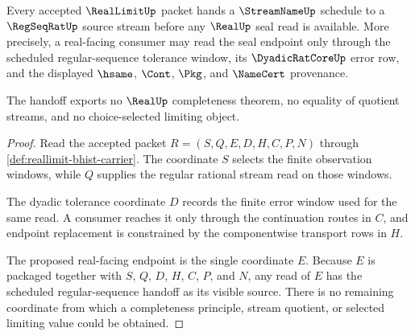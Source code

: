 \begin{theorem}
\label{thm:reallimit-regseqrat-streamname-handoff}
Every accepted $\RealLimitUp$ packet hands a $\StreamNameUp$ schedule to a
$\RegSeqRatUp$ source stream before any $\RealUp$ seal read is available. More
precisely, a real-facing consumer may read the seal endpoint only through the
scheduled regular-sequence tolerance window, its $\DyadicRatCoreUp$ error row,
and the displayed $\hsame$, $\Cont$, $\Pkg$, and $\NameCert$ provenance.

The handoff exports no $\RealUp$ completeness theorem, no equality of quotient
streams, and no choice-selected limiting object.
\end{theorem}
\begin{proof}
Read the accepted packet
$R=(S,Q,E,D,H,C,P,N)$ through
\autoref{def:reallimit-bhist-carrier}. The coordinate $S$ selects the finite
observation windows, while $Q$ supplies the regular rational stream read on
those windows.

The dyadic tolerance coordinate $D$ records the finite error window used for the
same read. A consumer reaches it only through the continuation routes in $C$,
and endpoint replacement is constrained by the componentwise transport rows in
$H$.

The proposed real-facing endpoint is the single coordinate $E$. Because $E$ is
packaged together with $S$, $Q$, $D$, $H$, $C$, $P$, and $N$, any read of $E$
has the scheduled regular-sequence handoff as its visible source. There is no
remaining coordinate from which a completeness principle, stream quotient, or
selected limiting value could be obtained.
\end{proof}

